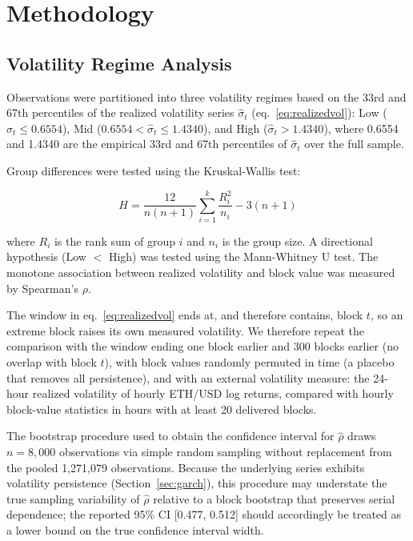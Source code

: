\documentclass[11pt]{article}
\begin{document}
\section{Methodology}
\label{sec:method}

\subsection{Volatility Regime Analysis}
\label{sec:method_vol}

Observations were partitioned into three volatility regimes based on the 33rd
and 67th percentiles of the realized volatility series $\hat\sigma_t$
(eq.~\ref{eq:realizedvol}): Low ($\hat\sigma_t \leq 0.6554$), Mid
($0.6554 < \hat\sigma_t \leq 1.4340$), and High ($\hat\sigma_t > 1.4340$),
where 0.6554 and 1.4340 are the empirical 33rd and 67th percentiles of
$\hat\sigma_t$ over the full sample.

Group differences were tested using the Kruskal-Wallis test:

\begin{equation}
H = \frac{12}{n(n+1)} \sum_{i=1}^{k} \frac{R_i^2}{n_i} - 3(n+1)
\label{eq:kruskalwallis}
\end{equation}

where $R_i$ is the rank sum of group $i$ and $n_i$ is the group size. A
directional hypothesis (Low $<$ High) was tested using the Mann-Whitney U test.
The monotone association between realized volatility and block value was measured
by Spearman's $\rho$.

The window in eq.~\ref{eq:realizedvol} ends at, and therefore contains, block
$t$, so an extreme block raises its own measured volatility. We therefore
repeat the comparison with the window ending one block earlier and 300 blocks
earlier (no overlap with block $t$), with block values randomly permuted in
time (a placebo that removes all persistence), and with an external
volatility measure: the 24-hour realized volatility of hourly ETH/USD log
returns, compared with hourly block-value statistics in hours with at least
20 delivered blocks.

The bootstrap procedure used to obtain the confidence interval for
$\hat\rho$ draws $n=8{,}000$ observations via simple random sampling without
replacement from the pooled 1,271,079 observations. Because the underlying
series exhibits volatility persistence (Section~\ref{sec:garch}), this
procedure may understate the true sampling variability of
$\hat\rho$ relative to a block bootstrap that preserves serial dependence; the
reported 95\% CI [0.477, 0.512] should accordingly be treated as a lower bound
on the true confidence interval width.
\end{document}
